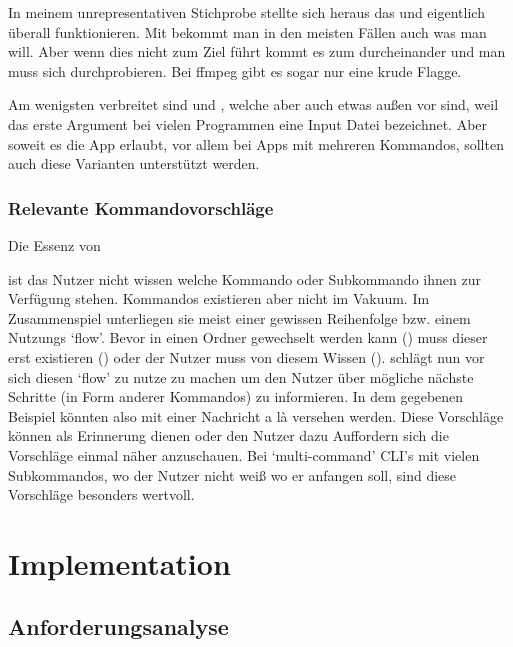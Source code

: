 \documentclass[oneside,bibliography=totocnumbered,BCOR=5mm]{scrbook}
\begin{document}
In meinem unrepresentativen Stichprobe stellte sich heraus das
 und  eigentlich überall funktionieren. Mit
 bekommt man in den meisten Fällen auch was man will. Aber
wenn dies nicht zum Ziel führt kommt es zum durcheinander und man muss sich
durchprobieren. Bei ffmpeg gibt es sogar nur eine krude 
Flagge.

Am wenigsten verbreitet sind  und , welche
aber auch etwas außen vor sind, weil das erste Argument bei vielen Programmen
eine Input Datei bezeichnet. Aber soweit es die App erlaubt, vor allem bei Apps
mit mehreren Kommandos, sollten auch diese Varianten unterstützt werden.

\subsection{Relevante Kommandovorschläge}

Die Essenz von %

ist das Nutzer nicht wissen welche Kommando oder Subkommando ihnen zur Verfügung
stehen. Kommandos existieren aber nicht im Vakuum. Im Zusammenspiel unterliegen
sie meist einer gewissen Reihenfolge bzw. einem Nutzungs `flow'. Bevor in einen
Ordner gewechselt werden kann () muss dieser erst existieren
() oder der Nutzer muss von diesem Wissen ().
\cite{dutta} schlägt nun vor sich diesen `flow' zu nutze zu machen um den Nutzer
über mögliche nächste Schritte (in Form anderer Kommandos) zu informieren. In
dem gegebenen Beispiel könnten also  mit einer Nachricht a là
 versehen werden. Diese Vorschläge können als
Erinnerung dienen oder den Nutzer dazu Auffordern sich die Vorschläge einmal
näher anzuschauen. Bei `multi-command' CLI's mit vielen Subkommandos, wo der
Nutzer nicht weiß wo er anfangen soll, sind diese Vorschläge besonders wertvoll.


\chapter{Implementation}
\section{Anforderungsanalyse}
\end{document}
